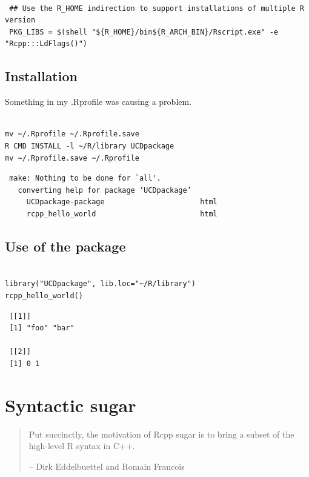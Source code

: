\documentclass[11pt]{article}
\begin{document}
\begin{verbatim}
 
 ## Use the R_HOME indirection to support installations of multiple R version
 PKG_LIBS = $(shell "${R_HOME}/bin${R_ARCH_BIN}/Rscript.exe" -e "Rcpp:::LdFlags()")
\end{verbatim}
\subsection{Installation}
\label{sec-8-10}


Something in my .Rprofile was causing a problem.


\begin{verbatim}

mv ~/.Rprofile ~/.Rprofile.save
R CMD INSTALL -l ~/R/library UCDpackage
mv ~/.Rprofile.save ~/.Rprofile
\end{verbatim}

\begin{verbatim}
 make: Nothing to be done for `all'.
   converting help for package ‘UCDpackage’
     UCDpackage-package                      html  
     rcpp_hello_world                        html  
\end{verbatim}
\subsection{Use of the package}
\label{sec-8-11}




\begin{verbatim}

library("UCDpackage", lib.loc="~/R/library")
rcpp_hello_world()
\end{verbatim}

\begin{verbatim}
 [[1]]
 [1] "foo" "bar"
 
 [[2]]
 [1] 0 1
\end{verbatim}
\section{Syntactic sugar}
\label{sec-9}


\begin{quote}

Put succinctly, the motivation of Rcpp sugar is to bring a subset of
the high-level R syntax in C++.

-- Dirk Eddelbuettel and Romain Francois

\end{quote}
\end{document}
